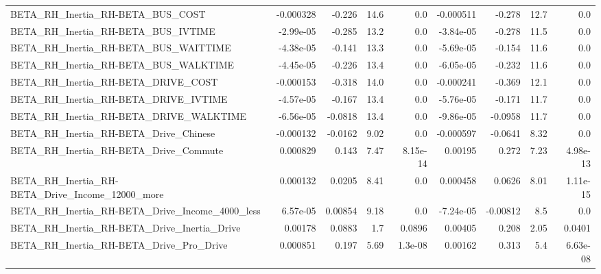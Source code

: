\begin{tabular}{lrrrrrrrr}
BETA\_RH\_Inertia\_RH-BETA\_BUS\_COST                   &   -0.000328 &       -0.226 &     14.6 &      0.0 &  -0.000511 &      -0.278 &         12.7 &           0.0 \\
BETA\_RH\_Inertia\_RH-BETA\_BUS\_IVTIME                 &   -2.99e-05 &       -0.285 &     13.2 &      0.0 &  -3.84e-05 &      -0.278 &         11.5 &           0.0 \\
BETA\_RH\_Inertia\_RH-BETA\_BUS\_WAITTIME               &   -4.38e-05 &       -0.141 &     13.3 &      0.0 &  -5.69e-05 &      -0.154 &         11.6 &           0.0 \\
BETA\_RH\_Inertia\_RH-BETA\_BUS\_WALKTIME               &   -4.45e-05 &       -0.226 &     13.4 &      0.0 &  -6.05e-05 &      -0.232 &         11.6 &           0.0 \\
BETA\_RH\_Inertia\_RH-BETA\_DRIVE\_COST                 &   -0.000153 &       -0.318 &     14.0 &      0.0 &  -0.000241 &      -0.369 &         12.1 &           0.0 \\
BETA\_RH\_Inertia\_RH-BETA\_DRIVE\_IVTIME               &   -4.57e-05 &       -0.167 &     13.4 &      0.0 &  -5.76e-05 &      -0.171 &         11.7 &           0.0 \\
BETA\_RH\_Inertia\_RH-BETA\_DRIVE\_WALKTIME             &   -6.56e-05 &      -0.0818 &     13.4 &      0.0 &  -9.86e-05 &     -0.0958 &         11.7 &           0.0 \\
BETA\_RH\_Inertia\_RH-BETA\_Drive\_Chinese              &   -0.000132 &      -0.0162 &     9.02 &      0.0 &  -0.000597 &     -0.0641 &         8.32 &           0.0 \\
BETA\_RH\_Inertia\_RH-BETA\_Drive\_Commute              &    0.000829 &        0.143 &     7.47 & 8.15e-14 &    0.00195 &       0.272 &         7.23 &      4.98e-13 \\
BETA\_RH\_Inertia\_RH-BETA\_Drive\_Income\_12000\_more    &    0.000132 &       0.0205 &     8.41 &      0.0 &   0.000458 &      0.0626 &         8.01 &      1.11e-15 \\
BETA\_RH\_Inertia\_RH-BETA\_Drive\_Income\_4000\_less     &    6.57e-05 &      0.00854 &     9.18 &      0.0 &  -7.24e-05 &    -0.00812 &          8.5 &           0.0 \\
BETA\_RH\_Inertia\_RH-BETA\_Drive\_Inertia\_Drive        &     0.00178 &       0.0883 &      1.7 &   0.0896 &    0.00405 &       0.208 &         2.05 &        0.0401 \\
BETA\_RH\_Inertia\_RH-BETA\_Drive\_Pro\_Drive            &    0.000851 &        0.197 &     5.69 &  1.3e-08 &    0.00162 &       0.313 &          5.4 &      6.63e-08 \\

\end{tabular}
